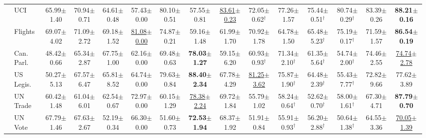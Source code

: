 \begin{table}[t]
{\begin{tabular}{llccccccccccccc}
 & UCI & 65.99{\scriptsize$\pm$1.40} & 70.94{\scriptsize$\pm$0.71} & 64.61{\scriptsize$\pm$0.48} & 57.43{\scriptsize$\pm$0.00} & 80.10{\scriptsize$\pm$0.51} & 57.55{\scriptsize$\pm$0.81} & \underline{83.61{\scriptsize$\pm$0.23}} & 72.05{\scriptsize$\pm$0.62}$^\dagger$ & 77.26{\scriptsize$\pm$1.57} & 75.44{\scriptsize$\pm$0.51}$^\dagger$ & 80.74{\scriptsize$\pm$0.29}$^\dagger$ & 83.39{\scriptsize$\pm$0.26} & \textbf{88.21{\scriptsize$\pm$0.16}} \\
 & Flights & 69.07{\scriptsize$\pm$4.02} & 71.09{\scriptsize$\pm$2.72} & 69.18{\scriptsize$\pm$1.52} & \underline{81.08{\scriptsize$\pm$0.00}} & 74.87{\scriptsize$\pm$0.21} & 59.16{\scriptsize$\pm$1.48} & 61.99{\scriptsize$\pm$1.70} & 70.92{\scriptsize$\pm$1.78} & 64.78{\scriptsize$\pm$1.50} & 65.48{\scriptsize$\pm$5.23}$^\dagger$ & 75.19{\scriptsize$\pm$0.17}$^\dagger$ & 71.59{\scriptsize$\pm$1.57} & \textbf{86.54{\scriptsize$\pm$0.19}} \\
 & Can. Parl. & 48.42{\scriptsize$\pm$0.66} & 65.34{\scriptsize$\pm$2.87} & 67.75{\scriptsize$\pm$1.00} & 62.16{\scriptsize$\pm$0.00} & 69.48{\scriptsize$\pm$0.63} & \textbf{78.03{\scriptsize$\pm$1.27}} & 59.15{\scriptsize$\pm$6.20} & 60.93{\scriptsize$\pm$0.93}$^\dagger$ & 71.34{\scriptsize$\pm$2.10}$^\dagger$ & 61.35{\scriptsize$\pm$5.64}$^\dagger$ & 54.74{\scriptsize$\pm$2.00}$^\dagger$ & 74.46{\scriptsize$\pm$2.55} & \underline{74.74{\scriptsize$\pm$2.78}} \\
 & US Legis. & 50.27{\scriptsize$\pm$5.13} & 67.57{\scriptsize$\pm$6.47} & 65.81{\scriptsize$\pm$8.52} & 64.74{\scriptsize$\pm$0.00} & 79.63{\scriptsize$\pm$0.84} & \textbf{88.40{\scriptsize$\pm$2.34}} & 67.78{\scriptsize$\pm$4.29} & \underline{81.25{\scriptsize$\pm$3.62}} & 75.87{\scriptsize$\pm$1.90}$^\dagger$ & 64.48{\scriptsize$\pm$2.39}$^\dagger$ & 55.43{\scriptsize$\pm$7.77}$^\dagger$ & 72.82{\scriptsize$\pm$9.66} & 77.62{\scriptsize$\pm$3.89} \\
 & UN Trade & 60.42{\scriptsize$\pm$1.48} & 61.04{\scriptsize$\pm$6.01} & 62.54{\scriptsize$\pm$0.67} & 72.97{\scriptsize$\pm$0.00} & 60.15{\scriptsize$\pm$1.29} & \underline{78.38{\scriptsize$\pm$2.24}} & 69.72{\scriptsize$\pm$1.84} & 55.79{\scriptsize$\pm$1.02} & 58.24{\scriptsize$\pm$0.64}$^\dagger$ & 52.62{\scriptsize$\pm$0.70}$^\dagger$ & 58.00{\scriptsize$\pm$1.61}$^\dagger$ & 67.30{\scriptsize$\pm$4.71} & \textbf{87.79{\scriptsize$\pm$0.70}} \\
 & UN Vote & 67.79{\scriptsize$\pm$1.46} & 67.63{\scriptsize$\pm$2.67} & 52.19{\scriptsize$\pm$0.34} & 66.30{\scriptsize$\pm$0.00} & 51.60{\scriptsize$\pm$0.73} & \textbf{72.53{\scriptsize$\pm$1.94}} & 68.37{\scriptsize$\pm$1.92} & 51.91{\scriptsize$\pm$0.84} & 55.91{\scriptsize$\pm$0.93}$^\dagger$ & 56.20{\scriptsize$\pm$2.88}$^\dagger$ & 50.64{\scriptsize$\pm$1.38}$^\dagger$ & 64.55{\scriptsize$\pm$3.36} & \underline{70.05{\scriptsize$\pm$1.39}} \\

\end{tabular}}
\end{table}
